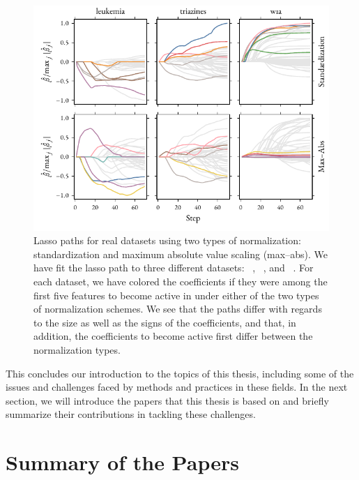 \begin{figure}[htpb]
  \centering
  \includegraphics[]{figures/realdata_paths.pdf}
  \caption{%
    Lasso paths for real datasets using two types of normalization: standardization and maximum absolute value scaling (max--abs). We have fit the lasso path to three different datasets: ~\parencite{golub1999}, ~\parencite{king}, and ~\parencite{platt1998}. For each dataset, we have colored the coefficients if they were among the first five features to become active in under either of the two types of normalization schemes. We see that the paths differ with regards to the size as well as the signs of the coefficients, and that, in addition, the coefficients to become active first differ between the normalization types.
  }
  \label{fig:normalized-realdata-lasso-paths}
\end{figure}

This concludes our introduction to the topics of this thesis, including some of the issues and challenges faced by methods and practices in these fields. In the next section, we will introduce the papers that this thesis is based on and briefly summarize their contributions in tackling these challenges.

\section{Summary of the Papers}


